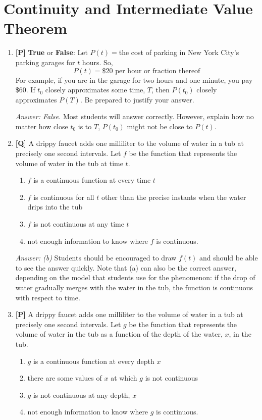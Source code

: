 \documentclass[12pt]{article}
\begin{document}
\section{Continuity and Intermediate Value Theorem}
\begin{enumerate}

\item {\bf [P]} {\bf True} or \textbf{False}: Let $P(t)=$the cost of parking in New York City's parking garages for
$t$ hours.  So,
\[P(t)=\mbox{\$20 per hour or fraction thereof}\]
For example, if you are in the garage for two hours and one minute, you pay \$60.
If $t_0$ closely approximates some time, $T$, then
$P(t_0)$ closely approximates $P(T)$. Be prepared to justify your answer.

{\it Answer: False.} Most students will answer correctly. However, explain how no matter how close $t_0$ is to $T$, $P(t_0)$ might not be close to $P(t)$.

\bigskip

\item {\bf [Q]} 
A drippy faucet adds one milliliter to the volume of water in a tub at 
precisely one second intervals.  Let $f$ be the function that
represents the volume of water in the tub at time $t$.
\begin{enumerate}
\item $f$ is a continuous function at every time $t$
\item $f$ is continuous for all $t$ other than the precise instants 
when the water drips into the tub
\item $f$ is not continuous at any time $t$
\item not enough information to know where $f$ is continuous.
\end{enumerate}

{\it Answer: (b)}  Students should be encouraged to draw $f(t)$
and should be able to see the answer quickly. Note that (a) can also be the correct answer,
depending on the model that students use for the phenomenon: if the drop of water gradually 
merges with the water in the tub, the function is continuous with respect to time.

\bigskip

\item {\bf [P]}
A drippy faucet adds one milliliter to the volume of water in a tub at 
precisely one second intervals.  Let $g$ be the function that 
represents the volume of water in the tub as a function of the depth 
of the water, $x$, in the tub.
\begin{enumerate}
\item $g$ is a continuous function at every depth $x$
\item there are some values of $x$ at which $g$ is not continuous
\item $g$ is not continuous at any depth, $x$
\item not enough information to know where $g$ is continuous.
\end{enumerate}


\end{enumerate}
\end{document}

